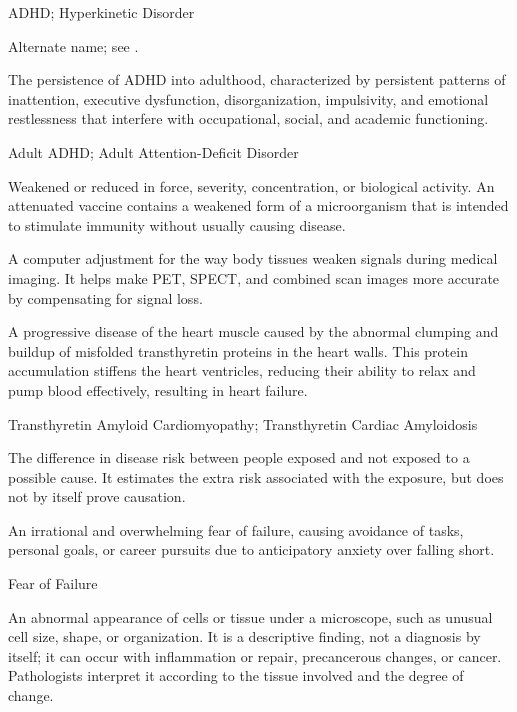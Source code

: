 
\synonyms
ADHD; Hyperkinetic Disorder

 Alternate name; see .

 The persistence of ADHD into adulthood, characterized by persistent patterns of inattention, executive dysfunction, disorganization, impulsivity, and emotional restlessness that interfere with occupational, social, and academic functioning.

\synonyms
Adult ADHD; Adult Attention-Deficit Disorder

 Weakened or reduced in force, severity, concentration, or biological activity. An attenuated vaccine contains a weakened form of a microorganism that is intended to stimulate immunity without usually causing disease.

 A computer adjustment for the way body tissues weaken signals during medical imaging. It helps make PET, SPECT, and combined scan images more accurate by compensating for signal loss.

 A progressive disease of the heart muscle caused by the abnormal clumping and buildup of misfolded transthyretin proteins in the heart walls. This protein accumulation stiffens the heart ventricles, reducing their ability to relax and pump blood effectively, resulting in heart failure.

\synonyms
Transthyretin Amyloid Cardiomyopathy; Transthyretin Cardiac Amyloidosis

 The difference in disease risk between people exposed and not exposed to a possible cause. It estimates the extra risk associated with the exposure, but does not by itself prove causation.

 An irrational and overwhelming fear of failure, causing avoidance of tasks, personal goals, or career pursuits due to anticipatory anxiety over falling short.

\synonyms
Fear of Failure

 An abnormal appearance of cells or tissue under a microscope, such as unusual cell size, shape, or organization. It is a descriptive finding, not a diagnosis by itself; it can occur with inflammation or repair, precancerous changes, or cancer. Pathologists interpret it according to the tissue involved and the degree of change.

